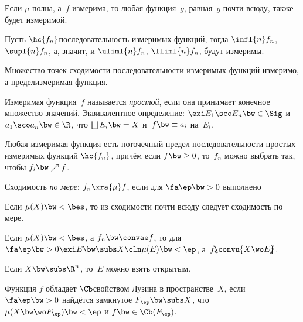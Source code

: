 \documentclass[a4paper,draft]{article}
\begin{document}
\begin{stm}
Если $\mu$ полна, а~$f$ измерима, то любая функция~$g$, равная~$g$ почти всюду, также будет измеримой.
\end{stm}

\begin{stm}
  Пусть $\hc{f_n}$\т последовательность измеримых функций, тогда $\infl{n}f_n$, $\supl{n}f_n$, а, значит, и
  $\uliml{n} f_n$, $\lliml{n} f_n$, будут измеримы.
\end{stm}

\begin{theorem}
  Множество точек сходимости последовательности измеримых функций измеримо,
  а предел\т измеримая функция.
\end{theorem}

\begin{df}
  Измеримая функция~$f$ называется \emph{простой}, если она принимает конечное множество значений.
  Эквивалентное определение: $\exi E_1\sco E_n \bw\in \Sig$ и $a_1\sco a_n \bw\in \R$, что
  $\bigsqcup E_i \bw= X$ и~$f \bw\equiv a_i$ на~$E_i$.
\end{df}

\begin{theorem}
  Любая измеримая функция есть поточечный предел последовательности простых измеримых
  функций $\hc{f_n}$, причём если $f \bw\ge 0$, то~$f_n$ можно выбрать так,
  чтобы $f_i \bw\nearrow f$.
\end{theorem}

\begin{df}
  Сходимость \emph{по мере}: $f_n \xra{\mu} f$, если для $\fa\ep \bw> 0$ выполнено
\end{df}

\begin{theorem}
  Если $\mu(X) \bw< \bes$, то из сходимости почти всюду следует сходимость по мере.
\end{theorem}

\begin{theorem}[Егорова]
  Если $\mu(X) \bw< \bes$, а $f_n \bw\convae f$, то для
  $\fa\ep \bw>0 \exi E \bw\subs X\cln \mu(E) \bw< \ep$, а~$f_n \mskip-10mu \convu{X\wo E}\mskip-10mu f$.
\end{theorem}

\begin{note}
  Если $X \bw\subs \R^n$, то~$E$ можно взять открытым.
\end{note}

\begin{df}
  Функция $f$ обладает $\Cb$\д свойством Лузина в пространстве~$X$,
  если $\fa\ep \bw> 0$ найдётся замкнутое $F_\ep \bw\subs X$, что
  $\mu(X \bw\wo F_\ep)\bw< \ep$ и $f \bw\in \Cb(F_\ep)$.
\end{df}
\end{document}

